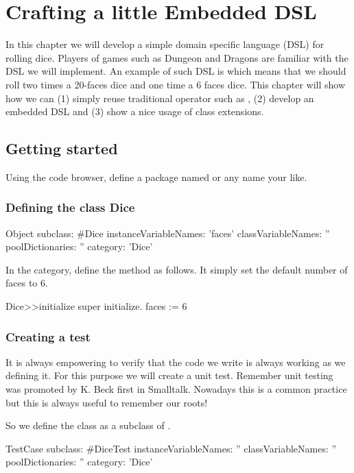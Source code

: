 \documentclass[a4paper,10pt,twoside]{book}
\begin{document}
\fi
\sloppy

\chapter{Crafting a little Embedded DSL}
In this chapter we will develop a simple domain specific language (DSL) for rolling dice. Players of games such as Dungeon and Dragons are familiar with the DSL we will implement. An example of such DSL is  which means that we should roll two times a 20-faces dice and one time a 6 faces dice. This chapter will show how we can (1) simply reuse traditional operator such as \ct{+}, (2) develop an embedded DSL and (3) show a nice usage of class extensions.
\section{ Getting started}
Using the code browser, define a package named  or any name your like.
\subsection{ Defining the class Dice}

\begin{code}{}
Object subclass: #Dice
	instanceVariableNames: 'faces'
	classVariableNames: ''
	poolDictionaries: ''
	category: 'Dice'
\end{code}


In the  category, define the method  as follows. It simply set the default number of faces to 6. 


\begin{code}{}
Dice>>initialize 
	super initialize.
	faces := 6
\end{code}

\subsection{ Creating a test }
It is always empowering to verify that the code we write is always working as we defining it. For 
this purpose we will create a unit test. Remember unit testing was promoted by K. Beck first in Smalltalk. Nowadays this is a common practice but this is always useful to remember our roots!

So we define the class  as a subclass of .


\begin{code}{}
TestCase subclass: #DiceTest
	instanceVariableNames: ''
	classVariableNames: ''
	poolDictionaries: ''
	category: 'Dice'
\end{code}
\end{document}
